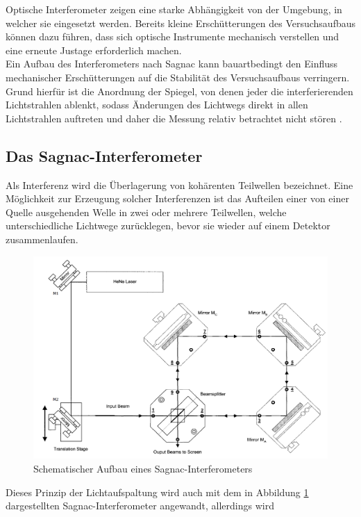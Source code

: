 \noindent Optische Interferometer zeigen eine starke Abhängigkeit von der Umgebung, in
welcher sie eingesetzt werden. Bereits kleine Erschütterungen des Versuchsaufbaus
können dazu führen, dass sich optische Instrumente mechanisch verstellen und eine
erneute Justage erforderlich machen. \\
\noindent Ein Aufbau des Interferometers nach Sagnac kann bauartbedingt den
Einfluss mechanischer Erschütterungen auf die Stabilität des Versuchsaufbaus
verringern. Grund hierfür ist die Anordnung der Spiegel, von denen jeder die
interferierenden Lichtstrahlen ablenkt, sodass Änderungen des Lichtwegs direkt
in allen Lichtstrahlen auftreten und daher die Messung relativ betrachtet nicht
stören \cite{demtroeder}. \\
\subsection{Das Sagnac-Interferometer}
\noindent Als Interferenz wird die Überlagerung von kohärenten Teilwellen
bezeichnet. Eine Möglichkeit zur Erzeugung solcher Interferenzen ist das
Aufteilen einer von einer Quelle ausgehenden Welle in zwei oder mehrere
Teilwellen, welche unterschiedliche Lichtwege zurücklegen, bevor sie wieder
auf einem Detektor zusammenlaufen. \\
\FloatBarrier
\begin{figure}
  \centering
  \includegraphics[scale=0.5]{resources/fig_01.png}
  \caption{Schematischer Aufbau eines Sagnac-Interferometers \cite{sample}}
  \label{fig:01}
\end{figure}
\FloatBarrier
\noindent Dieses Prinzip der Lichtaufspaltung wird auch mit dem in Abbildung
\ref{fig:01} dargestellten Sagnac-Interferometer angewandt, allerdings wird
